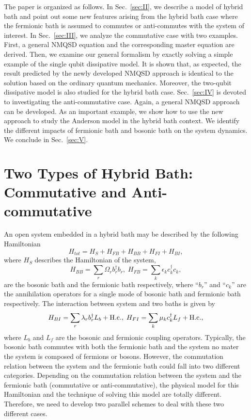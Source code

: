 \documentclass[preprint]{elsarticle}
\begin{document}
The paper is organized as follows. In Sec.~\ref{sec:II}, we describe
a model of hybrid bath and point out some new features arising from 
the hybrid bath case where the fermionic bath is assumed to commutes or anti-commutes
with the system of interest. In Sec.~\ref{sec:III}, we analyze the commutative
case with two examples. First, a general NMQSD equation and the corresponding
master equation are derived. Then, we examine our general formalism by exactly solving
a simple example of  the single qubit dissipative model. It is shown
that, as expected,  the result predicted by the newly developed NMQSD approach is
identical to the solution based on the ordinary quantum mechanics.
Moreover, the two-qubit dissipative model is also studied for the hybrid bath case.
 Sec.~\ref{sec:IV} is devoted to investigating the anti-commutative case. Again, a general NMQSD approach 
 can be developed.  As an important example,  we show how to use the new approach to study 
 the Anderson model in the hybrid bath context. We identify the different
impacts of fermionic bath and bosonic bath on the system dynamics. We conclude in
Sec.~\ref{sec:V}. 


\section{\label{sec:II} Two Types of Hybrid Bath: Commutative and Anti-commutative}

An open system embedded in a hybrid bath may be described by the following
Hamiltonian
\begin{equation}
H_{tot}=H_{S}+H_{FB}+H_{BB}+H_{FI}+H_{BI},\label{Hybrid}
\end{equation}
where $H_{S}$ describes the Hamiltonian of the system,
\begin{equation}
H_{BB}=\sum_{r}\Omega_{r}b_{r}^{\dagger}b_{r},\;
 H_{FB}=\sum_{k}\epsilon_{k}c_{k}^{\dagger}c_{k},\label{HB}
\end{equation}
are the bosonic bath and the fermionic bath respectively, where ``$b_{r}$'' and ``$c_{k}$''
are the annihilation operators for a single mode of bosonic bath and
fermionic bath respectively. The interaction between system and two
baths is given by
\begin{equation}
H_{BI}=\sum_{r}\lambda_{r}b_{r}^{\dagger}L_{b}+{\rm H.c.},\;
H_{FI}=\sum_{k}\mu_{k}c_{k}^{\dagger}L_{f}+{\rm H.c.},\label{HInt}
\end{equation}
where $L_{b}$ and $L_{f}$ are the bosonic and fermionic coupling operators.
Typically, the bosonic bath commutes with both the fermionic bath
and the system no mater the system is composed of fermions or bosons.
However, the commutation relation between the system and the fermionic
bath could fall into two different categories. Depending
on the commutation relation between the system and the fermionic bath
(commutative or anti-commutative), the physical model for this Hamiltonian
and the technique of solving this model are totally different. Therefore,
we need to develop two parallel schemes to deal with these two different
cases.
\end{document}
